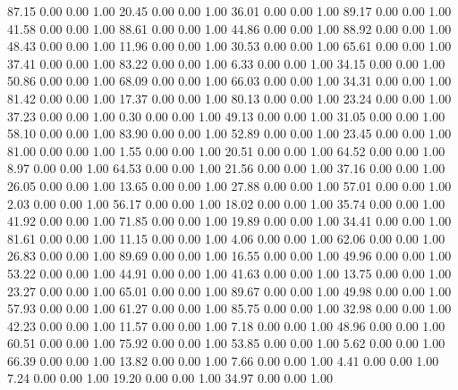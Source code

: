    87.15   0.00   0.00   1.00
   20.45   0.00   0.00   1.00
   36.01   0.00   0.00   1.00
   89.17   0.00   0.00   1.00
   41.58   0.00   0.00   1.00
   88.61   0.00   0.00   1.00
   44.86   0.00   0.00   1.00
   88.92   0.00   0.00   1.00
   48.43   0.00   0.00   1.00
   11.96   0.00   0.00   1.00
   30.53   0.00   0.00   1.00
   65.61   0.00   0.00   1.00
   37.41   0.00   0.00   1.00
   83.22   0.00   0.00   1.00
    6.33   0.00   0.00   1.00
   34.15   0.00   0.00   1.00
   50.86   0.00   0.00   1.00
   68.09   0.00   0.00   1.00
   66.03   0.00   0.00   1.00
   34.31   0.00   0.00   1.00
   81.42   0.00   0.00   1.00
   17.37   0.00   0.00   1.00
   80.13   0.00   0.00   1.00
   23.24   0.00   0.00   1.00
   37.23   0.00   0.00   1.00
    0.30   0.00   0.00   1.00
   49.13   0.00   0.00   1.00
   31.05   0.00   0.00   1.00
   58.10   0.00   0.00   1.00
   83.90   0.00   0.00   1.00
   52.89   0.00   0.00   1.00
   23.45   0.00   0.00   1.00
   81.00   0.00   0.00   1.00
    1.55   0.00   0.00   1.00
   20.51   0.00   0.00   1.00
   64.52   0.00   0.00   1.00
    8.97   0.00   0.00   1.00
   64.53   0.00   0.00   1.00
   21.56   0.00   0.00   1.00
   37.16   0.00   0.00   1.00
   26.05   0.00   0.00   1.00
   13.65   0.00   0.00   1.00
   27.88   0.00   0.00   1.00
   57.01   0.00   0.00   1.00
    2.03   0.00   0.00   1.00
   56.17   0.00   0.00   1.00
   18.02   0.00   0.00   1.00
   35.74   0.00   0.00   1.00
   41.92   0.00   0.00   1.00
   71.85   0.00   0.00   1.00
   19.89   0.00   0.00   1.00
   34.41   0.00   0.00   1.00
   81.61   0.00   0.00   1.00
   11.15   0.00   0.00   1.00
    4.06   0.00   0.00   1.00
   62.06   0.00   0.00   1.00
   26.83   0.00   0.00   1.00
   89.69   0.00   0.00   1.00
   16.55   0.00   0.00   1.00
   49.96   0.00   0.00   1.00
   53.22   0.00   0.00   1.00
   44.91   0.00   0.00   1.00
   41.63   0.00   0.00   1.00
   13.75   0.00   0.00   1.00
   23.27   0.00   0.00   1.00
   65.01   0.00   0.00   1.00
   89.67   0.00   0.00   1.00
   49.98   0.00   0.00   1.00
   57.93   0.00   0.00   1.00
   61.27   0.00   0.00   1.00
   85.75   0.00   0.00   1.00
   32.98   0.00   0.00   1.00
   42.23   0.00   0.00   1.00
   11.57   0.00   0.00   1.00
    7.18   0.00   0.00   1.00
   48.96   0.00   0.00   1.00
   60.51   0.00   0.00   1.00
   75.92   0.00   0.00   1.00
   53.85   0.00   0.00   1.00
    5.62   0.00   0.00   1.00
   66.39   0.00   0.00   1.00
   13.82   0.00   0.00   1.00
    7.66   0.00   0.00   1.00
    4.41   0.00   0.00   1.00
    7.24   0.00   0.00   1.00
   19.20   0.00   0.00   1.00
   34.97   0.00   0.00   1.00
